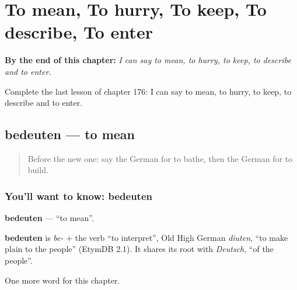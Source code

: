 
\chapter{To mean, To hurry, To keep, To describe, To enter}
\label{ch:ge-to-mean-to-hurry-to-keep-to-describe-to-enter}

\begin{chapteropening}
\textbf{By the end of this chapter:} \emph{I can say to mean, to hurry, to keep, to describe and to enter.}

Complete the last lesson of chapter 176: I can say to mean, to hurry, to keep, to describe and to enter.
\end{chapteropening}

\section[bedeuten]{bedeuten — to mean}

\label{lesson:GE-C176-bedeuten}



\begin{quote}
Before the new one: say the German for to bathe, then the German for to build.
\end{quote}

\subsection*{You'll want to know: bedeuten}
\textbf{bedeuten} — \textquotedblleft{}to mean\textquotedblright{}.

\begin{cousinweb}
\textbf{bedeuten} is \emph{be-} + the verb \textquotedblleft{}to interpret\textquotedblright{}, Old High German \emph{diuten}, \textquotedblleft{}to make plain to the people\textquotedblright{} (EtymDB 2.1). It shares its root with \emph{Deutsch}, \textquotedblleft{}of the people\textquotedblright{}.
\end{cousinweb}

\begin{grammarlens}[title={What you've built}]
One more word for this chapter.
\end{grammarlens}

